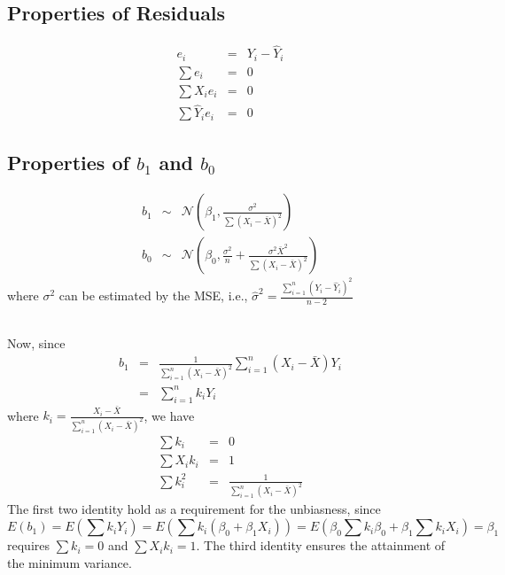 \documentclass{article}
\newcommand{\NN}{\mathcal{N}}
\begin{document}
\subsection{Properties of Residuals}
\begin{eqnarray}
	e_i & = & Y_i - \hat Y_i \\
	\sum e_i & = & 0 \\
	\sum X_i e_i & = & 0 \\
	\sum \hat Y_i e_i & = & 0
\end{eqnarray}

\subsection{Properties of $b_1$ and $b_0$}
\begin{eqnarray}
	b_1 &\sim& \NN \left(\beta_1,\frac{\sigma^2}{\sum(X_i-\bar X)^2}\right) \\
	b_0 &\sim& \NN \left(\beta_0,\frac{\sigma^2}{n} + \frac{\sigma^2 {\bar X}^2}{\sum(X_i-\bar X)^2} \right)
\end{eqnarray}
where $\sigma^2$ can be estimated by the MSE, i.e., $\hat \sigma^2 = \frac{\sum_{i=1}^n (Y_i - \hat Y_i)^2}{n-2}$

\noindent
\\
Now, since
\begin{eqnarray}
	b_1 & = & \frac{1}{\sum_{i=1}^n (X_i - \bar X)^2 } \sum_{i=1}^n (X_i-\bar X) Y_i \\
	& = & \sum_{i=1}^n k_i Y_i
\end{eqnarray}
where $k_i = \frac{X_i-\bar X}{\sum_{i=1}^n (X_i - \bar X)^2 }$, we have
\begin{eqnarray}
	\sum k_i &=& 0 \\
	\sum X_i k_i &=& 1 \\
	\sum k_i^2 &=& \frac{1}{\sum_{i=1}^n (X_i - \bar X)^2 }
\end{eqnarray}
The first two identity hold as a requirement for the unbiasness, since $$E(b_1) = E\left(\sum k_i Y_i\right)= E\left(\sum k_i (\beta_0+\beta_1 X_i)\right) = E\left(\beta_0 \sum k_i \beta_0 + \beta_1 \sum k_i X_i \right) = \beta_1$$ requires $\sum k_i = 0$  and $\sum X_i k_i = 1$.
The third identity ensures the attainment of the minimum variance.
\end{document}
